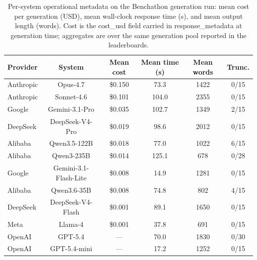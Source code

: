 \begin{table}[t]
\centering\footnotesize
\caption{Per-system operational metadata on the Benchathon generation run: mean cost per generation (USD), mean wall-clock response time (s), and mean output length (words). Cost is the cost\_usd field carried in response\_metadata at generation time; aggregates are over the same generation pool reported in the leaderboards.}
\label{tbl-system-cost}
\setlength{\tabcolsep}{4pt}
\begin{tabular*}{\textwidth}{@{\extracolsep{\fill}}lccccc@{}}
\toprule
Provider & System & Mean cost & Mean time (s) & Mean words & Trunc. \\
\midrule
Anthropic & Opus-4.7 & \$0.150 & 73.3 & 1422 & 0/15 \\
Anthropic & Sonnet-4.6 & \$0.101 & 104.0 & 2355 & 0/15 \\
Google & Gemini-3.1-Pro & \$0.035 & 102.7 & 1349 & 2/15 \\
DeepSeek & DeepSeek-V4-Pro & \$0.019 & 98.6 & 2012 & 0/15 \\
Alibaba & Qwen3.5-122B & \$0.018 & 77.0 & 1022 & 6/15 \\
Alibaba & Qwen3-235B & \$0.014 & 125.1 & 678 & 0/28 \\
Google & Gemini-3.1-Flash-Lite & \$0.008 & 14.9 & 1281 & 0/15 \\
Alibaba & Qwen3.6-35B & \$0.008 & 74.8 & 802 & 4/15 \\
DeepSeek & DeepSeek-V4-Flash & \$0.001 & 89.1 & 1650 & 0/15 \\
Meta & Llama-4 & \$0.001 & 37.8 & 691 & 0/15 \\
OpenAI & GPT-5.4 & --- & 70.0 & 1830 & 0/30 \\
OpenAI & GPT-5.4-mini & --- & 17.2 & 1252 & 0/15 \\
\bottomrule
\end{tabular*}
\end{table}
